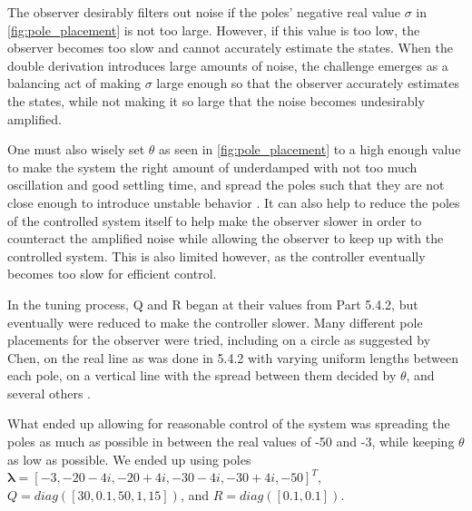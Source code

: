 The observer desirably filters out noise if the poles' negative real value $\sigma$ in \cref{fig:pole_placement} is not too large. However, if this value is too low, the observer becomes too slow and cannot accurately estimate the states. When the double derivation introduces large amounts of noise, the challenge emerges as a balancing act of making $\sigma$ large enough so that the observer accurately estimates the states, while not making it so large that the noise becomes undesirably amplified.

One must also wisely set $\theta$ as seen in \cref{fig:pole_placement} to a high enough value to make the system the right amount of underdamped with not too much oscillation and good settling time, and spread the poles such that they are not close enough to introduce unstable behavior \cite[p.290]{chen14}. It can also help to reduce the poles of the controlled system itself to help make the observer slower in order to counteract the amplified noise while allowing the observer to keep up with the controlled system. This is also limited however, as the controller eventually becomes too slow for efficient control.

In the tuning process, Q and R began at their values from Part 5.4.2, but eventually were reduced to make the controller slower. Many different pole placements for the observer were tried, including on a circle as suggested by Chen, on the real line as was done in 5.4.2 with varying uniform lengths between each pole, on a vertical line with the spread between them decided by $\theta$, and several others \cite[p.290]{chen14}.

What ended up allowing for reasonable control of the system was spreading the poles as much as possible in between the real values of -50 and -3, while keeping $\theta$ as low as possible.  We ended up using poles $\bm{\lambda} = [-3, -20-4i, -20+4i, -30-4i, -30+4i, -50]^T$, $Q = diag([30, 0.1, 50, 1, 15])$, and $R = diag([0.1, 0.1])$.

